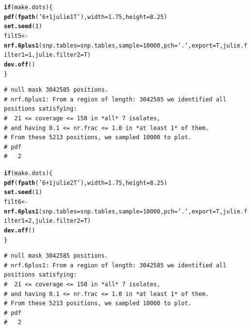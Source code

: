 \documentclass{article}\usepackage[]{graphicx}\usepackage[]{color}
\makeatletter
\newcommand{\hlnum}[1]{\textcolor[rgb]{0.686,0.059,0.569}{#1}}%
\newcommand{\hlstr}[1]{\textcolor[rgb]{0.192,0.494,0.8}{#1}}%
\newcommand{\hlstd}[1]{\textcolor[rgb]{0.345,0.345,0.345}{#1}}%
\newcommand{\hlkwa}[1]{\textcolor[rgb]{0.161,0.373,0.58}{\textbf{#1}}}%
\newcommand{\hlkwb}[1]{\textcolor[rgb]{0.69,0.353,0.396}{#1}}%
\newcommand{\hlkwc}[1]{\textcolor[rgb]{0.333,0.667,0.333}{#1}}%
\newcommand{\hlkwd}[1]{\textcolor[rgb]{0.737,0.353,0.396}{\textbf{#1}}}%
\newenvironment{kframe}{%
 \def\at@end@of@kframe{}%
 \ifinner\ifhmode%
  \def\at@end@of@kframe{\end{minipage}}%
  \begin{minipage}{\columnwidth}%
 \fi\fi%
 \def\FrameCommand##1{\hskip\@totalleftmargin \hskip-\fboxsep
 \colorbox{shadecolor}{##1}\hskip-\fboxsep
     \hskip-\linewidth \hskip-\@totalleftmargin \hskip\columnwidth}%
 \MakeFramed {\advance\hsize-\width
   \@totalleftmargin\z@ \linewidth\hsize
   \@setminipage}}%
 {\par\unskip\endMakeFramed%
 \at@end@of@kframe}
\newenvironment{knitrout}{}{} %
\makeatother
\begin{document}
\begin{knitrout}\footnotesize
{}\color{fgcolor}\begin{kframe}
\begin{alltt}
\hlkwa{if}\hlstd{(make.dots)\{}
  \hlkwd{pdf}\hlstd{(}\hlkwd{fpath}\hlstd{(}\hlstr{'6+1julie1T'}\hlstd{),} \hlkwc{width}\hlstd{=}\hlnum{1.75}\hlstd{,} \hlkwc{height}\hlstd{=}\hlnum{8.25}\hlstd{)}
  \hlkwd{set.seed}\hlstd{(}\hlnum{1}\hlstd{)}
  \hlstd{filt5} \hlkwb{<-} \hlkwd{nrf.6plus1}\hlstd{(}\hlkwc{snp.tables}\hlstd{=snp.tables,}\hlkwc{sample}\hlstd{=}\hlnum{10000}\hlstd{,}\hlkwc{pch}\hlstd{=}\hlstr{'.'}\hlstd{,}\hlkwc{export}\hlstd{=T,}\hlkwc{julie.filter1}\hlstd{=}\hlnum{1}\hlstd{,}\hlkwc{julie.filter2}\hlstd{=T)}
  \hlkwd{dev.off}\hlstd{()}
\hlstd{\}}
\end{alltt}
\begin{verbatim}
# null mask 3042585 positions.
# nrf.6plus1: From a region of length: 3042585 we identified all positions satisfying: 
#  21 <= coverage <= 150 in *all* 7 isolates, 
# and having 0.1 <= nr.frac <= 1.0 in *at least 1* of them. 
# From these 5213 positions, we sampled 10000 to plot.
# pdf 
#   2
\end{verbatim}
\end{kframe}
\end{knitrout}
\begin{knitrout}\footnotesize
{}\color{fgcolor}\begin{kframe}
\begin{alltt}
\hlkwa{if}\hlstd{(make.dots)\{}
  \hlkwd{pdf}\hlstd{(}\hlkwd{fpath}\hlstd{(}\hlstr{'6+1julie2T'}\hlstd{),} \hlkwc{width}\hlstd{=}\hlnum{1.75}\hlstd{,} \hlkwc{height}\hlstd{=}\hlnum{8.25}\hlstd{)}
  \hlkwd{set.seed}\hlstd{(}\hlnum{1}\hlstd{)}
  \hlstd{filt6} \hlkwb{<-} \hlkwd{nrf.6plus1}\hlstd{(}\hlkwc{snp.tables}\hlstd{=snp.tables,}\hlkwc{sample}\hlstd{=}\hlnum{10000}\hlstd{,}\hlkwc{pch}\hlstd{=}\hlstr{'.'}\hlstd{,}\hlkwc{export}\hlstd{=T,}\hlkwc{julie.filter1}\hlstd{=}\hlnum{2}\hlstd{,}\hlkwc{julie.filter2}\hlstd{=T)}
  \hlkwd{dev.off}\hlstd{()}
\hlstd{\}}
\end{alltt}
\begin{verbatim}
# null mask 3042585 positions.
# nrf.6plus1: From a region of length: 3042585 we identified all positions satisfying: 
#  21 <= coverage <= 150 in *all* 7 isolates, 
# and having 0.1 <= nr.frac <= 1.0 in *at least 1* of them. 
# From these 5213 positions, we sampled 10000 to plot.
# pdf 
#   2
\end{verbatim}
\end{kframe}
\end{knitrout}
\end{document}
